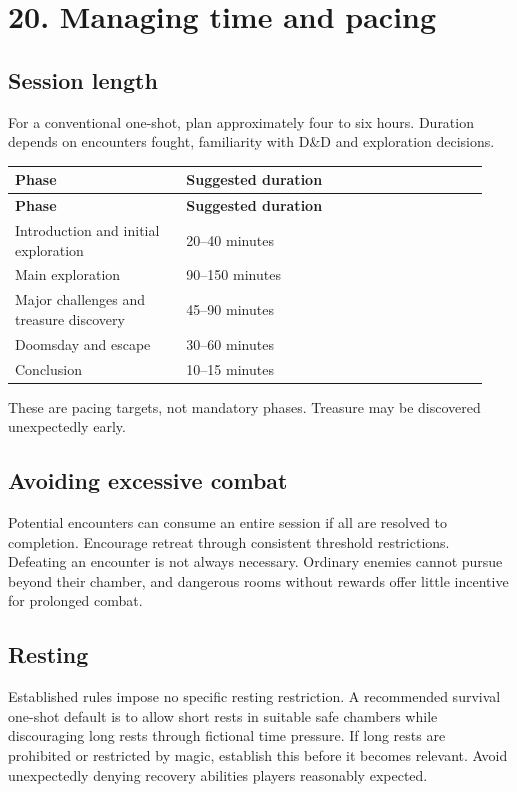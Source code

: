 \section{20. Managing time and pacing}

\subsection{Session length}

For a conventional one-shot, plan approximately four to six hours. Duration depends on encounters fought, familiarity with D\&D and exploration decisions.

\begin{longtable}{p{0.34\linewidth}p{0.60\linewidth}}
\rowcolor{tablehead} \textbf{Phase} & \textbf{Suggested duration} \\
\endfirsthead
\rowcolor{tablehead} \textbf{Phase} & \textbf{Suggested duration} \\
\endhead
Introduction and initial exploration & 20–40 minutes \\
Main exploration & 90–150 minutes \\
Major challenges and treasure discovery & 45–90 minutes \\
Doomsday and escape & 30–60 minutes \\
Conclusion & 10–15 minutes \\
\end{longtable}

These are pacing targets, not mandatory phases. Treasure may be discovered unexpectedly early.

\subsection{Avoiding excessive combat}

Potential encounters can consume an entire session if all are resolved to completion. Encourage retreat through consistent threshold restrictions. Defeating an encounter is not always necessary. Ordinary enemies cannot pursue beyond their chamber, and dangerous rooms without rewards offer little incentive for prolonged combat.

\subsection{Resting}

Established rules impose no specific resting restriction. A recommended survival one-shot default is to allow short rests in suitable safe chambers while discouraging long rests through fictional time pressure. If long rests are prohibited or restricted by magic, establish this before it becomes relevant. Avoid unexpectedly denying recovery abilities players reasonably expected.

